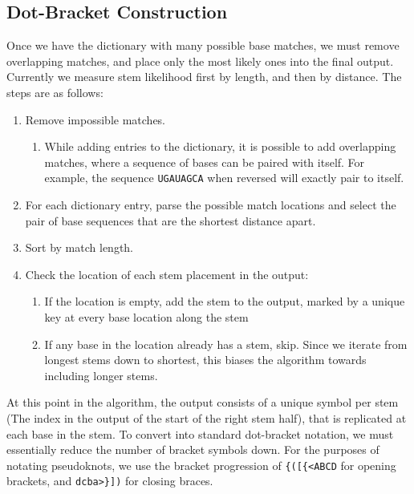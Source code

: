 \documentclass[sigconf]{acmart}
\begin{document}
\subsection{Dot-Bracket Construction}
Once we have the dictionary with many possible base matches, we must remove overlapping matches, and place only the most likely ones into the final output. Currently we measure stem likelihood first by length, and then by distance. The steps are as follows:
\begin{enumerate}
\item Remove impossible matches.
	\begin{enumerate}
	\item While adding entries to the dictionary, it is possible to add overlapping matches, where a sequence of bases can be paired with itself. For example, the sequence \texttt{UGAUAGCA} when reversed will exactly pair to itself. 
	\end{enumerate}
\item For each dictionary entry, parse the possible match locations and select the pair of base sequences that are the shortest distance apart.
\item Sort by match length.
\item Check the location of each stem placement in the output:
	\begin{enumerate}
	\item If the location is empty, add the stem to the output, marked by a unique key at every base location along the stem
	\item If any base in the location already has a stem, skip. Since we iterate from longest stems down to shortest, this biases the algorithm towards including longer stems.
	\end{enumerate}
\end{enumerate}


At this point in the algorithm, the output consists of a unique symbol per stem (The index in the output of the start of the right stem half), that is replicated at each base in the stem. To convert into standard dot-bracket notation, we must essentially reduce the number of bracket symbols down. For the purposes of notating pseudoknots, we use the bracket progression of \verb|{([{<ABCD| for opening brackets, and \verb|dcba>}])| for closing braces.
\end{document}
